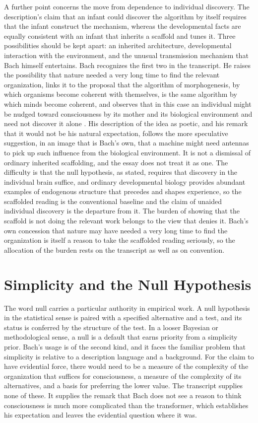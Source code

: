 \documentclass[11pt]{article}
\begin{document}
A further point concerns the move from dependence to individual discovery. The description's claim that an infant could discover the algorithm by itself requires that the infant construct the mechanism, whereas the developmental facts are equally consistent with an infant that inherits a scaffold and tunes it. Three possibilities should be kept apart: an inherited architecture, developmental interaction with the environment, and the unusual transmission mechanism that Bach himself entertains. Bach recognizes the first two in the transcript. He raises the possibility that nature needed a very long time to find the relevant organization, links it to the proposal that the algorithm of morphogenesis, by which organisms become coherent with themselves, is the same algorithm by which minds become coherent, and observes that in this case an individual might be nudged toward consciousness by its mother and its biological environment and need not discover it alone \cite{levin2019}. His description of the idea as poetic, and his remark that it would not be his natural expectation, follows the more speculative suggestion, in an image that is Bach's own, that a machine might need antennas to pick up such influence from the biological environment. It is not a dismissal of ordinary inherited scaffolding, and the essay does not treat it as one. The difficulty is that the null hypothesis, as stated, requires that discovery in the individual brain suffice, and ordinary developmental biology provides abundant examples of endogenous structure that precedes and shapes experience, so the scaffolded reading is the conventional baseline and the claim of unaided individual discovery is the departure from it. The burden of showing that the scaffold is not doing the relevant work belongs to the view that denies it. Bach's own concession that nature may have needed a very long time to find the organization is itself a reason to take the scaffolded reading seriously, so the allocation of the burden rests on the transcript as well as on convention.

\section{Simplicity and the Null Hypothesis}

The word null carries a particular authority in empirical work. A null hypothesis in the statistical sense is paired with a specified alternative and a test, and its status is conferred by the structure of the test. In a looser Bayesian or methodological sense, a null is a default that earns priority from a simplicity prior. Bach's usage is of the second kind, and it faces the familiar problem that simplicity is relative to a description language and a background. For the claim to have evidential force, there would need to be a measure of the complexity of the organization that suffices for consciousness, a measure of the complexity of its alternatives, and a basis for preferring the lower value. The transcript supplies none of these. It supplies the remark that Bach does not see a reason to think consciousness is much more complicated than the transformer, which establishes his expectation and leaves the evidential question where it was.
\end{document}
